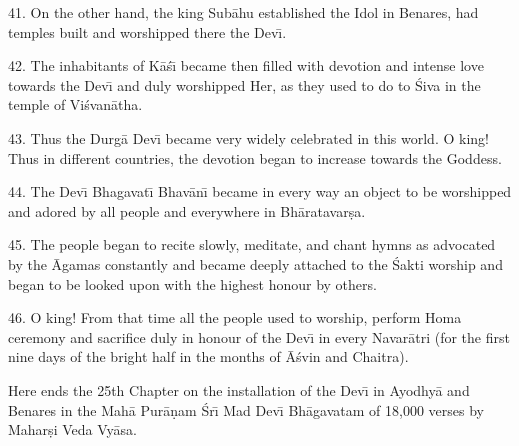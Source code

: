 41. On the other hand, the king Sub\=ahu established the Idol in Benares, had temples built and worshipped there the Dev\={\i}.

42. The inhabitants of K\=a\'s\={\i} became then filled with devotion and intense love towards the Dev\={\i} and duly worshipped Her, as they used to do to \'Siva in the temple of Vi\'svan\=atha.

43. Thus the Durg\=a Dev\={\i} became very widely celebrated in this world. O king! Thus in different countries, the devotion began to increase towards the Goddess.

44. The Dev\={\i} Bhagavat\={\i} Bhav\=an\={\i} became in every way an object to be worshipped and adored by all people and everywhere in Bh\=aratavar\d{s}a.

45. The people began to recite slowly, meditate, and chant hymns as advocated by the \=Agamas constantly and became deeply attached to the \'Sakti worship and began to be looked upon with the highest honour by others.

46. O king! From that time all the people used to worship, perform Homa ceremony and sacrifice duly in honour of the Dev\={\i} in every Navar\=atri (for the first nine days of the bright half in the months of \=A\'svin and Chaitra).

Here ends the 25th Chapter on the installation of the Dev\={\i} in Ayodhy\=a and Benares in the Mah\=a Pur\=a\d{n}am \'Sr\={\i} Mad Dev\={\i} Bh\=agavatam of 18,000 verses by Mahar\d{s}i Veda Vy\=asa.




